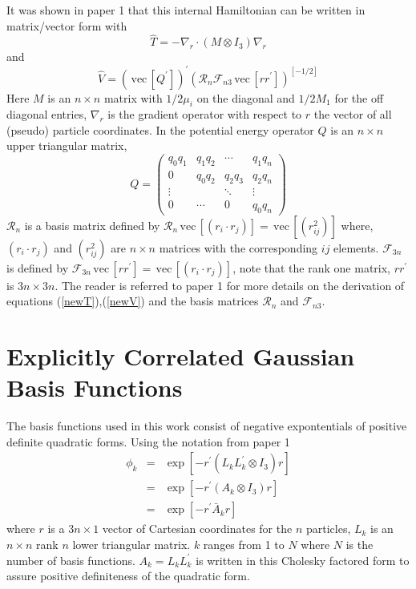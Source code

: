 \documentclass[12pt,thmsa]{article}
\begin{document}
It was shown in paper 1 that this internal Hamiltonian can be written in
matrix/vector form with 
\begin{equation}
\hat{T}=-\nabla _r\cdot \left( M\otimes I_3\right) \nabla _r  \label{newT}
\end{equation}
and 
\begin{equation}
\hat{V}=\left( \,\mathrm{vec}\,\left[ Q^{\prime }\right] \right) ^{\prime
}\left( \mathcal{R}_n\mathcal{F}_{n3}\,\mathrm{vec}\,\left[ rr^{\prime
}\right] \right) ^{\left[ -1/2\right] }  \label{newV}
\end{equation}
Here $M$ is an $n\times n$ matrix with $1/2\mu _i$ on the diagonal and $%
1/2M_1$ for the off diagonal entries, $\nabla _r$ is the gradient operator
with respect to $r$ the vector of all (pseudo) particle coordinates. In the
potential energy operator $Q$ is an $n\times n$ upper triangular matrix, 
\begin{equation}
Q=\left( 
\begin{array}{cccc}
q_0q_1 & q_1q_2 & \cdots & q_1q_n \\ 
0 & q_0q_2 & q_2q_3 & q_2q_n \\ 
\vdots &  & \ddots & \vdots \\ 
0 & \cdots & 0 & q_0q_n
\end{array}
\right)
\end{equation}
$\mathcal{R}_n$ is a basis matrix defined by $\mathcal{R}_n\,\mathrm{vec}%
\,\left[ \left( r_i\cdot r_j\right) \right] =\,\mathrm{vec}\,\left[ \left(
r_{ij}^2\right) \right] $ where, $\left( r_i\cdot r_j\right) $ and $\left(
r_{ij}^2\right) $ are $n\times n$ matrices with the corresponding $ij$
elements. $\mathcal{F}_{3n}\,$ is defined by $\mathcal{F}_{3n}\,\mathrm{vec}%
\,\left[ rr^{\prime }\right] =\,\mathrm{vec}\,\left[ \left( r_i\cdot
r_j\right) \right] $, note that the rank one matrix, $rr^{\prime }$ is $%
3n\times 3n$. The reader is referred to paper 1 for more details on the
derivation of equations (\ref{newT}),(\ref{newV}) and the basis matrices $%
\mathcal{R}_n$ and $\mathcal{F}_{n3}$.

\section{Explicitly Correlated Gaussian Basis Functions}

The basis functions used in this work consist of negative expontentials of
positive definite quadratic forms. Using the notation from paper 1 
\begin{eqnarray}
\phi _k &=&\exp \left[ -r^{\prime }\left( L_kL_k^{\prime }\otimes I_3\right)
r\right]  \label{phik} \\
&=&\exp \left[ -r^{\prime }\left( A_k\otimes I_3\right) r\right]
\label{phiAk} \\
&=&\exp \left[ -r^{\prime }\bar{A}_kr\right]
\end{eqnarray}
where $r$ is a $3n\times 1$ vector of Cartesian coordinates for the $n$
particles, $L_k$ is an $n\times n$ rank $n$ lower triangular matrix. $k$
ranges from 1 to $N$ where $N$ is the number of basis functions. $%
A_k=L_kL_k^{\prime }$ is written in this Cholesky factored form to assure
positive definiteness of the quadratic form.
\end{document}
